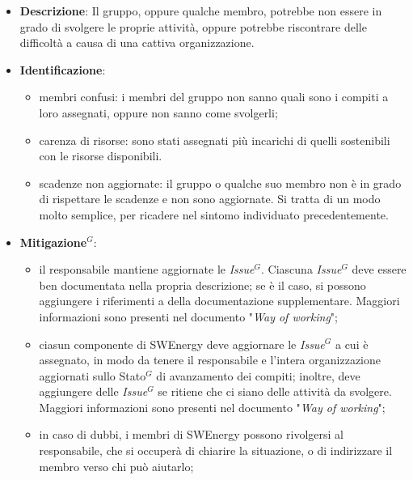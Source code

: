 \label{risk:organizzazione carente}
\begin{itemize}
	\item \textbf{Descrizione}:
	      Il gruppo, oppure qualche membro, potrebbe non essere in grado di
	      svolgere le proprie attività, oppure potrebbe riscontrare delle
	      difficoltà a causa di una cattiva organizzazione.
	\item \textbf{Identificazione}:
	      \begin{itemize}
		      \item membri confusi: i membri del gruppo non sanno quali sono i
		            compiti a loro assegnati, oppure non sanno come svolgerli;

		      \item carenza di risorse: sono stati assegnati più incarichi di
		            quelli sostenibili con le risorse disponibili.

		      \item scadenze non aggiornate: il gruppo o qualche suo membro non
		            è in grado di rispettare le scadenze e non sono aggiornate.
		            Si tratta di un modo molto semplice, per ricadere nel
		            sintomo individuato precedentemente.
	      \end{itemize}
	\item \textbf{\gls{Mitigazione}$^G$}:
	      \begin{itemize}
		      \item il responsabile mantiene aggiornate le \textit{\gls{Issue}$^G$}.
		            Ciascuna \textit{\gls{Issue}$^G$} deve essere ben documentata nella
		            propria descrizione; se è il caso, si possono aggiungere i
		            riferimenti a della documentazione supplementare. Maggiori
		            informazioni sono presenti nel documento "\textit{Way of
			            working}";

		      \item ciasun componente di SWEnergy deve aggiornare le
		            \textit{\gls{Issue}$^G$} a cui è assegnato, in modo da tenere il
		            responsabile e l'intera organizzazione aggiornati sullo
		            \gls{Stato}$^G$ di avanzamento dei compiti; inoltre, deve aggiungere
		            delle \textit{\gls{Issue}$^G$} se ritiene che ci siano delle attività
		            da svolgere. Maggiori informazioni sono presenti nel
		            documento "\textit{Way of working}";

		      \item in caso di dubbi, i membri di SWEnergy possono rivolgersi
		            al responsabile, che si occuperà di chiarire la situazione,
		            o di indirizzare il membro verso chi può aiutarlo;


\end{itemize}
\end{itemize}
